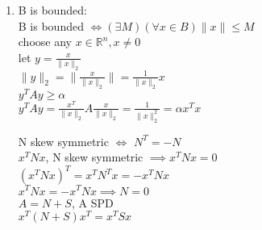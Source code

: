 \documentclass[12pt,letter]{article}
\newcommand{\R}{\mathbb{R}}
\begin{document}
\begin{enumerate}
\begin{enumerate}
  \item B is bounded:\\
    B is bounded $\iff (\exists M)(\forall x \in B) \|x\| \leq M$\\
    choose any $x \in \R^n, x \neq 0$\\
    let $y=\frac{x}{\|x\|_2}$\\
    $\|y\|_2=\|\frac{x}{\|x\|_2}\|=\frac{1}{\|x\|_2}x$\\
    $y^TAy \geq \alpha$\\
    $y^TAy = \frac{x^T}{\|x\|_2}A \frac{x}{\|x\|_2} = \frac{1}{\|x\|_2^2}=\alpha x^Tx$\\

    \pagebreak
    
    N skew symmetric $\iff$ $N^T=-N$\\
    $x^TN x$, N skew symmetric $\implies x^TNx = 0$\\
    $(x^TN x)^T= x^TN^Tx=-x^TNx$\\
    $x^TNx = -x^TNx \implies N=0$\\
    $A=N+S$, A SPD\\
    $x^T(N+S)x^T=x^TSx$\\
  \end{enumerate}
  

\end{enumerate}
\end{document}
